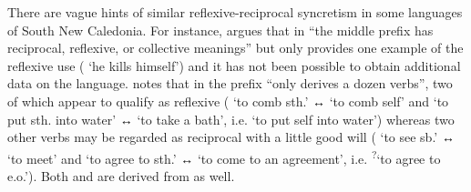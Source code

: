 There are vague hints of similar reflexive-reciprocal syncretism in some languages of South New Caledonia. For instance, \cite[39]{bril:2005} argues that in  “the middle prefix  has reciprocal, reflexive, or collective meanings” but only provides one example of the reflexive use ( ‘he kills himself’) and it has not been possible to obtain additional data on the language. \cite[1047]{moyse-faurie:2015} notes that in  the prefix  “only derives a dozen verbs”, two of which appear to qualify as reflexive ( ‘to comb sth.’ ↔  ‘to comb self’ and  ‘to put sth. into water’ ↔  ‘to take a bath’, i.e. ‘to put self into water’) whereas two other verbs may be regarded as reciprocal with a little good will ( ‘to see sb.’ ↔  ‘to meet’ and  ‘to agree to sth.’ ↔  ‘to come to an agreement’, i.e. \textsuperscript{?}‘to agree to e.o.’). Both   and   are derived from   as well.

